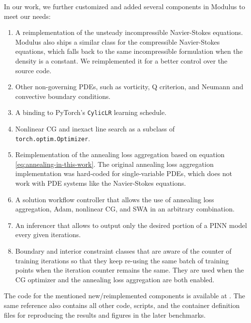 In our work, we further customized and added several components in Modulus to meet our needs:
\begin{enumerate}[nolistsep]
    \item A reimplementation of the unsteady incompressible Navier-Stokes equations.
    Modulus also ships a similar class for the compressible Navier-Stokes equations, which falls back to the same incompressible formulation when the density is a constant.
    We reimplemented it for a better control over the source code.
    \item Other non-governing PDEs, such as vorticity, Q criterion, and Neumann and convective boundary conditions.
    \item A binding to PyTorch's \lstinline{CylicLR} learning schedule.
    \item Nonlinear CG and inexact line search as a subclass of \lstinline{torch.optim.Optimizer}.
    \item Reimplementation of the annealing loss aggregation based on equation \eqref{eq:annealing-in-this-work}. The original annealing loss aggregation implementation was hard-coded for single-variable PDEs, which does not work with PDE systems like the Navier-Stokes equations.
    \item A solution workflow controller that allows the use of annealing loss aggregation, Adam, nonlinear CG, and SWA in an arbitrary combination. 
    \item An inferencer that allows to output only the desired portion of a PINN model every given iterations. 
    \item Boundary and interior constraint classes that are aware of the counter of training iterations so that they keep re-using the same batch of training points when the iteration counter remains the same.
    They are used when the CG optimizer and the annealing loss aggregation are both enabled.
\end{enumerate}

The code for the mentioned new/reimplemented components is available at \cite{chuang_dissertation_nodate}.
The same reference also contains all other code, scripts, and the container definition files for reproducing the results and figures in the later benchmarks.

